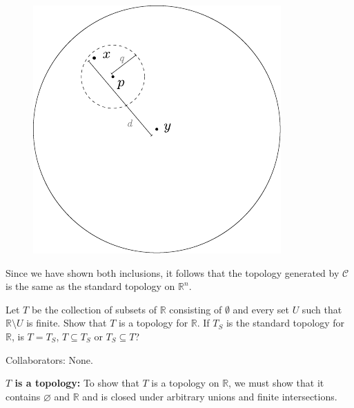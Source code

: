 \documentclass[11pt]{article}
\begin{document}
\begin{figure}[H]
	\centering
	\includegraphics[scale=1]{fig/ball.pdf}
\end{figure}


Since we have shown both inclusions, it follows that the topology generated by $\mathcal{C}$ is the same as the standard topology on $\mathbb{R}^n$.


\begin{exer}[5 points]
	Let $T$ be the collection of subsets of $\mathbb{R}$ consisting of $\emptyset$ and every set $U$ such that $\mathbb{R} \setminus U$ is finite. Show that $T$ is a topology for $\mathbb{R}$. If $T_S$ is the standard topology for $\mathbb{R}$, is $T = T_S$, $T \subseteq T_S$ or $T_S \subseteq T$?
\end{exer}
{\color{blue}Collaborators: None.}

\textbf{$T$ is a topology:} To show that $T$ is a topology on $\mathbb{R}$, we must show that it contains $\varnothing$ and $\mathbb{R}$ and is closed under arbitrary unions and finite intersections.
\end{document}
